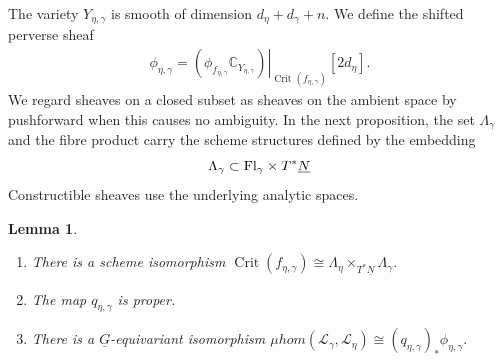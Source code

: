 \documentclass[11pt,reqno]{amsart}
\newtheorem{Lemma}[Theorem]{Lemma}
\theoremstyle{definition}
\theoremstyle{remark}
\def\bbC{\mathbb C}
\def\dN{\underline N}
\def\dG{\underline G}
\def\muhom{\mu hom}
\begin{document}
The variety $Y_{\eta,\gamma}$ is smooth of dimension $d_\eta+d_\gamma+n$.
We define the shifted perverse sheaf
\begin{align}\label{PEG2}
\phi_{\eta,\gamma}=\left.(\phi_{f_{\eta,\gamma}}
\bbC_{Y_{\eta,\gamma}})\right|_{\operatorname{Crit}(f_{\eta,\gamma})}[2d_\eta].
\end{align}
We regard sheaves on a closed subset as sheaves on the ambient
space by pushforward when this causes no ambiguity. In the next
proposition, the set $\Lambda_\gamma$ and the fibre product carry the
scheme structures defined by the embedding
$$\Lambda_\gamma\subset {\rm Fl}_\gamma\times T^*\dN$$
Constructible sheaves use the underlying analytic spaces.

\begin{Lemma}
\label{lem:offdiag-muhom}
\hfill
\begin{enumerate}[label=$\mathrm{(\alph*)}$,leftmargin=8mm]
\item
There is a scheme isomorphism
$\operatorname{Crit}(f_{\eta,\gamma})\cong\Lambda_\eta\times_{T^*\dN}\Lambda_\gamma.$

\item
The map $q_{\eta,\gamma}$ is proper. 
\item
There is a $\dG$-equivariant isomorphism
 $\muhom(\mathscr L_\gamma,\mathscr L_\eta)
 \cong (q_{\eta,\gamma})_*\phi_{\eta,\gamma}.$
\end{enumerate}
\end{Lemma}
\end{document}
